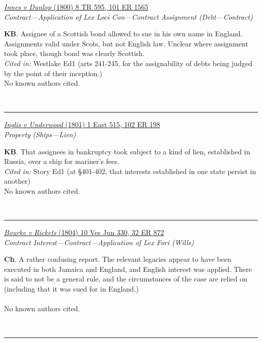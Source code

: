 \documentclass[twoside]{article}
\begin{document}
        \begin{small}
        \begin{center}
        \href{https://heinonline.org/HOL/P?h=hein.engrep/engrf0101&i=1569}{\textit{Innes v Dunlop} (1800) 8 TR 595, 101 ER 1565} \label{46} \\ 
\textit{Contract---Application of Lex Loci Con---Contract Assignment (Debt---Contract)}\\
        \end{center}
        \textbf{KB}. Assignee of a Scottish bond allowed to sue in his own name in England. Assignments valid under Scots, but not English law. Unclear where assignment took place, though bond was clearly Scottish.\\\textit{Cited in: }Westlake Ed1 (arts 241-245, for the assignability of debts being judged by the point of their inception.)\\No known authors cited.
        \end{small}\\
        \rule{\textwidth}{0.5pt}
        

        \begin{small}
        \begin{center}
        \href{https://heinonline.org/HOL/P?h=hein.engrep/engrf0102&i=202}{\textit{Inglis v Underwood} (1801) 1 East 515, 102 ER 198} \label{128} \\ 
\textit{Property (Ships---Lien)}\\
        \end{center}
        \textbf{KB}. That assignees in bankruptcy took subject to a kind of lien, established in Russia, over a ship for mariner’s fees.\\\textit{Cited in: }Story Ed1 (at §401-402, that interests established in one state persist in another)\\No known authors cited.
        \end{small}\\
        \rule{\textwidth}{0.5pt}
        

        \begin{small}
        \begin{center}
        \href{https://heinonline.org/HOL/P?h=hein.engrep/engrc0032&i=880}{\textit{Bourke v Rickets} (1804) 10 Ves Jun 330, 32 ER 872} \label{22} \\ 
\textit{Contract Interest---Contract---Application of Lex Fori (Wills)}\\
        \end{center}
        \textbf{Ch}. A rather confusing report. The relevant legacies appear to have been executed in both Jamaica and England, and English interest was applied. There is said to not be a general rule, and the circumstances of the case are relied on (including that it was sued for in England.)\\\\No known authors cited.
        \end{small}\\
        \rule{\textwidth}{0.5pt}
        
\end{document}
